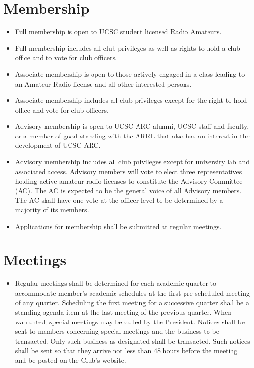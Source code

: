 \documentclass{article}
\begin{document}
\section{Membership}
\begin{itemize}

\item Full membership is open to UCSC student licensed Radio Amateurs.

\item Full membership includes all club privileges as well as rights to hold a club office and to vote for club officers.

\item Associate membership is open to those actively engaged in a class leading to an Amateur Radio license and all other interested persons.

\item Associate membership includes all club privileges except for the right to hold office and vote for club officers.

\item Advisory membership is open to UCSC ARC alumni, UCSC staff and faculty, or a member of good standing with the ARRL that also has an interest in the development of UCSC ARC.

\item Advisory membership includes all club privileges except for university lab and associated access. Advisory members will vote to elect three representatives holding active amateur radio licenses to constitute the Advisory Committee (AC). The AC is expected to be the general voice of all Advisory members. The AC shall have one vote at the officer level to be determined by a majority of its members.

\item Applications for membership shall be submitted at regular meetings.
\end{itemize}


\section{Meetings}
\begin{itemize}
\item Regular meetings shall be determined for each academic quarter to accommodate member's academic schedules at the first pre-scheduled meeting of any quarter. Scheduling the first meeting for a successive quarter shall be a standing agenda item at the last meeting of the previous quarter. When warranted, special meetings may be called by the President. Notices shall be sent to members concerning special meetings and the business to be transacted. Only such business as designated shall be transacted. Such notices shall be sent so that they arrive not less than 48 hours before the meeting and be posted on the Club's website.
\end{itemize}
\end{document}
